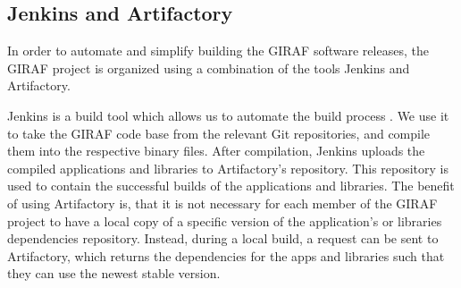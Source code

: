 \subsection{Jenkins and Artifactory}
In order to automate and simplify building the GIRAF software releases, the
GIRAF project is organized using a combination of the tools Jenkins and
Artifactory.\nl

Jenkins is a build tool which allows us to automate the build
process \citep{Jenkins}. We use it to take the GIRAF code base from the
relevant Git repositories, and compile them into the respective binary files.
After compilation, Jenkins uploads the compiled applications and libraries to
Artifactory's repository. This repository is used to contain the successful
builds of the applications and libraries. The benefit of using Artifactory is,
that it is not necessary for each member of the GIRAF project to have a local
copy of a specific version of the application's or libraries dependencies
repository. Instead, during a local build, a request can be sent to
Artifactory, which returns the dependencies for the apps and libraries such that they can use
the newest stable version.

